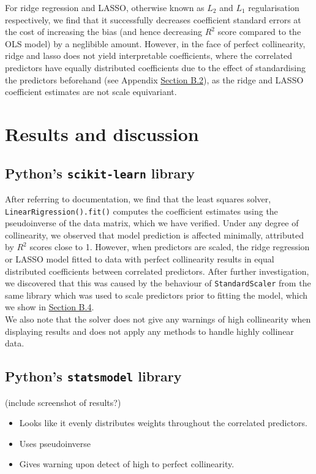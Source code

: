 \documentclass[12pt]{article}
\begin{document}
	
	For ridge regression and LASSO, otherwise known as $L_2$ and $L_1$ regularisation respectively, we find that it successfully decreases coefficient standard errors at the cost of increasing the bias (and hence decreasing $R^2$ score compared to the OLS model) by a neglibible amount. However, in the face of perfect collinearity, ridge and lasso does not yield interpretable coefficients, where the correlated predictors have equally distributed coefficients due to the effect of standardising the predictors beforehand (see Appendix \hyperref[sec:append2]{Section B.2}), as the ridge and LASSO coefficient estimates are not scale equivariant. 
	
	
	\section{Results and discussion}
	\subsection{Python's \texttt{scikit-learn} library}
	
	After referring to documentation, we find that the least squares solver, \texttt{LinearRigression().fit()} computes the coefficient estimates using the pseudoinverse of the data matrix, which we have verified. Under any degree of collinearity, we observed that model prediction is affected minimally, attributed by $R^2$ scores close to 1. However, when predictors are scaled, the ridge regression or LASSO model fitted to data with perfect collinearity results in equal distributed coefficients between correlated predictors. After further investigation, we discovered that this was caused by the behaviour of \texttt{StandardScaler} from the same library which was used to scale predictors prior to fitting the model, which we show in \hyperref[sec:append4]{Section B.4}.\\
	
	We also note that the solver does not give any warnings of high collinearity when displaying results and does not apply any methods to handle highly collinear data.
	
	\subsection{Python's \texttt{statsmodel} library}
	(include screenshot of results?)
	\begin{itemize}
		\item Looks like it evenly distributes weights throughout the correlated predictors.
		\item Uses pseudoinverse
		\item Gives warning upon detect of high to perfect collinearity.
	\end{itemize}
	
\end{document}
